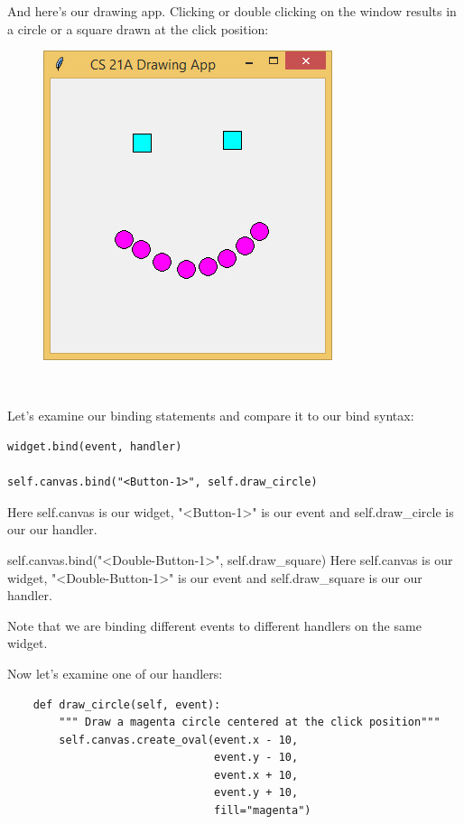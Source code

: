 \documentclass{article}
\begin{document}
And here's our drawing app.  Clicking or double clicking on the window results in a circle or a square drawn at the click position:

\begin{figure}[h]
\includegraphics[scale=.6]{drawingclick}
\end{figure}\

Let's examine our binding statements and compare it to our bind syntax:

\begin{lstlisting}
widget.bind(event, handler)

self.canvas.bind("<Button-1>", self.draw_circle)
\end{lstlisting}

Here self.canvas is our widget, "<Button-1>" is our event and self.draw{\_}circle is our our handler.

self.canvas.bind("<Double-Button-1>", self.draw{\_}square)
Here self.canvas is our widget, "<Double-Button-1>" is our event and self.draw{\_}square is our our handler.

Note that we are binding different events to different handlers on the same widget.

Now let's examine one of our handlers:

\begin{lstlisting}
    def draw_circle(self, event):
        """ Draw a magenta circle centered at the click position"""
        self.canvas.create_oval(event.x - 10,
                                event.y - 10,
                                event.x + 10,
                                event.y + 10,
                                fill="magenta")
\end{lstlisting}
\end{document}
